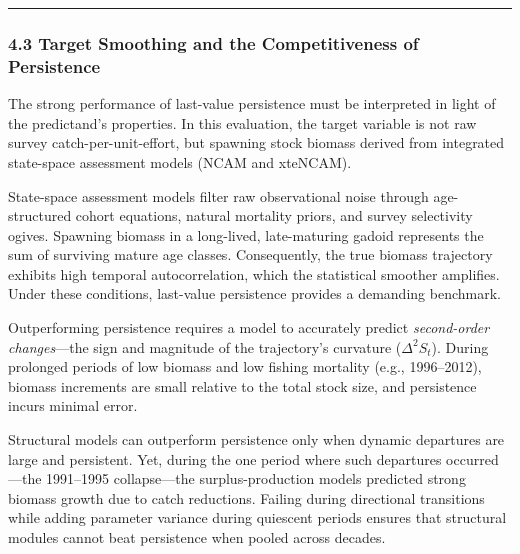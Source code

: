 \documentclass[11pt]{article}
\begin{document}
\begin{center}\rule{0.5\linewidth}{0.5pt}\end{center}

\subsubsection{4.3 Target Smoothing and the Competitiveness of
Persistence}\label{target-smoothing-and-the-competitiveness-of-persistence}

The strong performance of last-value persistence must be interpreted in
light of the predictand's properties. In this evaluation, the target
variable is not raw survey catch-per-unit-effort, but spawning stock
biomass derived from integrated state-space assessment models (NCAM and
xteNCAM).

State-space assessment models filter raw observational noise through
age-structured cohort equations, natural mortality priors, and survey
selectivity ogives. Spawning biomass in a long-lived, late-maturing
gadoid represents the sum of surviving mature age classes. Consequently,
the true biomass trajectory exhibits high temporal autocorrelation,
which the statistical smoother amplifies. Under these conditions,
last-value persistence provides a demanding benchmark.

Outperforming persistence requires a model to accurately predict
\emph{second-order changes}---the sign and magnitude of the trajectory's
curvature (\(\Delta^2 S_t\)). During prolonged periods of low biomass
and low fishing mortality (e.g., 1996--2012), biomass increments are
small relative to the total stock size, and persistence incurs minimal
error.

Structural models can outperform persistence only when dynamic
departures are large and persistent. Yet, during the one period where
such departures occurred---the 1991--1995 collapse---the
surplus-production models predicted strong biomass growth due to catch
reductions. Failing during directional transitions while adding
parameter variance during quiescent periods ensures that structural
modules cannot beat persistence when pooled across decades.
\end{document}

